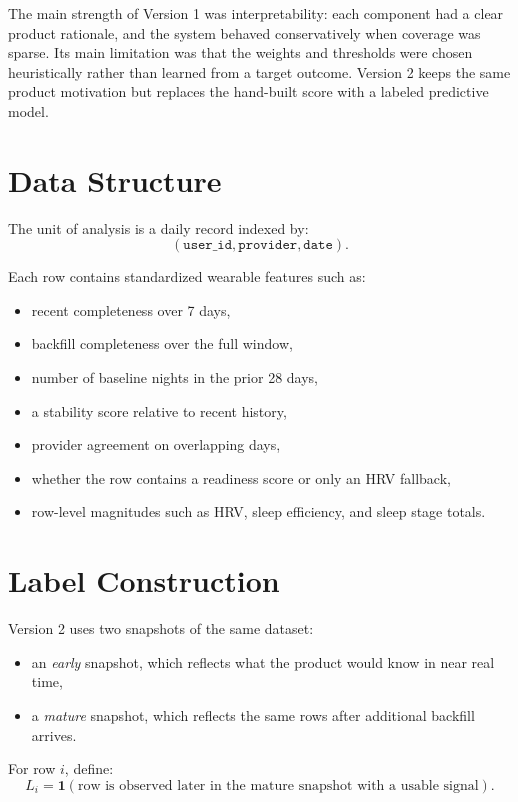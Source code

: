 \documentclass[11pt]{article}
\begin{document}
The main strength of Version 1 was interpretability: each component had a clear product rationale, and the system behaved conservatively when coverage was sparse. Its main limitation was that the weights and thresholds were chosen heuristically rather than learned from a target outcome. Version 2 keeps the same product motivation but replaces the hand-built score with a labeled predictive model.

\section{Data Structure}

The unit of analysis is a daily record indexed by:
\[
(\texttt{user\_id}, \texttt{provider}, \texttt{date}).
\]

Each row contains standardized wearable features such as:
\begin{itemize}[leftmargin=1.5em]
    \item recent completeness over 7 days,
    \item backfill completeness over the full window,
    \item number of baseline nights in the prior 28 days,
    \item a stability score relative to recent history,
    \item provider agreement on overlapping days,
    \item whether the row contains a readiness score or only an HRV fallback,
    \item row-level magnitudes such as HRV, sleep efficiency, and sleep stage totals.
\end{itemize}

\section{Label Construction}

Version 2 uses two snapshots of the same dataset:
\begin{itemize}[leftmargin=1.5em]
    \item an \emph{early} snapshot, which reflects what the product would know in near real time,
    \item a \emph{mature} snapshot, which reflects the same rows after additional backfill arrives.
\end{itemize}

For row $i$, define:
\[
L_i = \mathbf{1}(\text{row is observed later in the mature snapshot with a usable signal}).
\]
\end{document}
